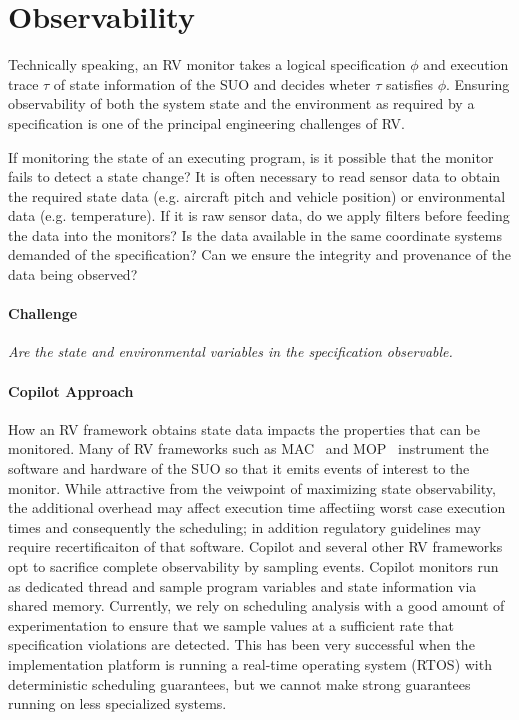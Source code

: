 \section{Observability}\label{sec:observ} 

Technically speaking, an RV monitor takes a logical specification 
$\phi$ and execution trace $\tau$ of state information of the SUO and
decides wheter $\tau$ satisfies $\phi$.  Ensuring observability of
both the system state and the environment as required by a
specification is one of the principal engineering challenges of RV.

  If monitoring the state of an executing program, is it possible that
  the  monitor fails to detect a state change?  It is often necessary
  to read sensor data to obtain the required   state data (e.g. aircraft
  pitch and  vehicle position)  or environmental data
  (e.g. temperature).  If it  is  raw sensor  data, do  we  apply
  filters  before feeding  the data  into  the monitors?  Is the  data
  available   in  the  same  coordinate   systems  demanded   of  the
  specification?  Can we ensure the  integrity and provenance  of the
  data  being observed?

\paragraph{Challenge} \emph{Are the state and environmental variables in the
specification  observable.}  


 
  \paragraph{Copilot Approach} 
  How an RV framework obtains state data impacts the properties that
  can be monitored.  Many of RV frameworks such as MAC~\cite{KimLKS04}
  and MOP~\cite{ChenR05} instrument the software and hardware of the
  SUO so that it emits events of interest to the monitor.  While
  attractive from the veiwpoint of maximizing state observability, the
  additional overhead may affect execution time affectiing worst case
  execution times and consequently the scheduling; in addition
  regulatory guidelines may require recertificaiton of that software.
  Copilot and several other RV
  frameworks~\cite{sampling,Kane15,borzoo} opt to sacrifice complete
  observability by sampling events.  Copilot monitors run as dedicated
  thread and sample program variables and state information via shared
  memory.  Currently, we rely on scheduling analysis with a good
  amount of experimentation to ensure that we sample values at a
  sufficient rate that specification violations are detected. This has
  been very successful when the implementation platform is running a
  real-time operating system (RTOS) with deterministic scheduling
  guarantees, but we cannot make strong guarantees running on less
  specialized systems.


